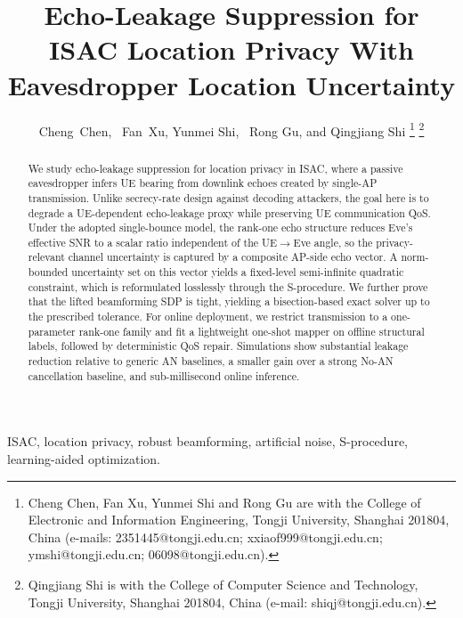 \documentclass[journal]{IEEEtran}
\begin{document}
\title{Echo-Leakage Suppression for ISAC Location Privacy With Eavesdropper Location Uncertainty}

\author{Cheng~Chen,~
    Fan~Xu, Yunmei Shi,~ Rong  Gu, and Qingjiang Shi%
\thanks{Cheng Chen, Fan Xu, Yunmei Shi and Rong Gu are with the College of Electronic and Information Engineering, Tongji University, Shanghai 201804, China (e-mails: 2351445@tongji.edu.cn;  xxiaof999@tongji.edu.cn; ymshi@tongji.edu.cn; 06098@tongji.edu.cn).}
\thanks{Qingjiang Shi is with the College of Computer Science and Technology, Tongji University, Shanghai 201804, China (e-mail: shiqj@tongji.edu.cn).}%
}

\maketitle

\begin{abstract}
We study echo-leakage suppression for location privacy in ISAC, where a passive eavesdropper infers UE bearing from downlink echoes created by single-AP transmission. Unlike secrecy-rate design against decoding attackers, the goal here is to degrade a UE-dependent echo-leakage proxy while preserving UE communication QoS. Under the adopted single-bounce model, the rank-one echo structure reduces Eve's effective SNR to a scalar ratio independent of the UE$\rightarrow$Eve angle, so the privacy-relevant channel uncertainty is captured by a composite AP-side echo vector. A norm-bounded uncertainty set on this vector yields a fixed-level semi-infinite quadratic constraint, which is reformulated losslessly through the S-procedure. We further prove that the lifted beamforming SDP is tight, yielding a bisection-based exact solver up to the prescribed tolerance. For online deployment, we restrict transmission to a one-parameter rank-one family and fit a lightweight one-shot mapper on offline structural labels, followed by deterministic QoS repair. Simulations show substantial leakage reduction relative to generic AN baselines, a smaller gain over a strong No-AN cancellation baseline, and sub-millisecond online inference.
\end{abstract}

\begin{IEEEkeywords}
ISAC, location privacy, robust beamforming, artificial noise, S-procedure, learning-aided optimization.
\end{IEEEkeywords}
\end{document}
